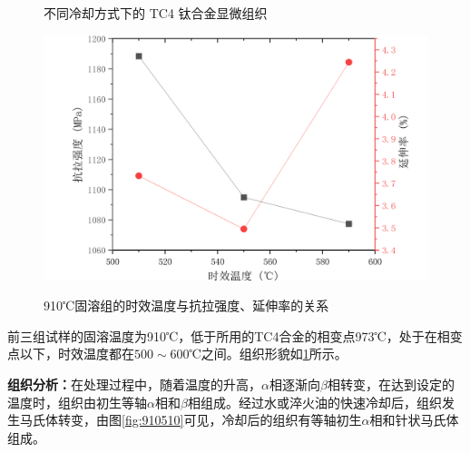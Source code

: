 \begin{figure}[htbp]
{\begin{minipage}[t]{0.33\linewidth}
					\label{fig:910550}
				\end{minipage}%
			}%
				\centering
				\label{910}
				\caption{不同冷却方式下的 TC4 钛合金显微组织}
			\end{figure}
			\begin{figure}[h!]
			\centering
			\includegraphics[width=0.7\linewidth]{pic/910分析}
			\label{fig:910}
			\caption{910℃固溶组的时效温度与抗拉强度、延伸率的关系}

		\end{figure}
			前三组试样的固溶温度为910℃，低于所用的TC4合金的相变点973℃，处于在相变点以下，时效温度都在$ 500\sim 600$℃之间。组织形貌如\ref{910}所示。

			\textbf{\faSchlix 组织分析：}在处理过程中，随着温度的升高，$ \alpha $相逐渐向$ \beta $相转变，在达到设定的温度时，组织由初生等轴$ \alpha $相和$ \beta $相组成。经过水或淬火油的快速冷却后，组织发生马氏体转变，由图\ref{fig:910510}可见，冷却后的组织有等轴初生$ \alpha $相和针状马氏体组成。

